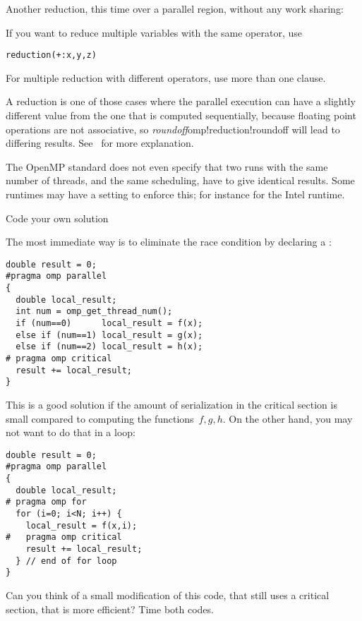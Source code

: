 Another reduction, this time over a parallel region,
without any work sharing:
%

If you want to reduce multiple variables with the same operator, use
\begin{lstlisting}
reduction(+:x,y,z)
\end{lstlisting}
For multiple reduction with different operators, use more than one clause.

\begin{remark}
  A reduction is one of those cases where the parallel execution can have a slightly different
  value from the one that is computed sequentially, because floating point operations
  are not associative, so \emph{roundoff}{omp!reduction!roundoff}
  will lead to differing results.
  See~ for more explanation.

  The OpenMP standard does not even specify that two runs with the same number of threads,
  and the same scheduling, have to give identical results.
  Some runtimes may have a setting to enforce this;
  for instance  for the Intel runtime.
\end{remark}

 {Code your own solution}

The most immediate way is to eliminate the race condition
by declaring a :
\begin{lstlisting}
double result = 0;
#pragma omp parallel
{
  double local_result;
  int num = omp_get_thread_num();
  if (num==0)      local_result = f(x);
  else if (num==1) local_result = g(x);
  else if (num==2) local_result = h(x);
# pragma omp critical
  result += local_result;
}
\end{lstlisting}

This is a good solution if the amount of serialization in the critical section
is small compared to computing the functions~$f,g,h$. On the other hand, you
may not want to do that in a loop:
\begin{lstlisting}
double result = 0;
#pragma omp parallel
{
  double local_result;
# pragma omp for
  for (i=0; i<N; i++) {
    local_result = f(x,i);
#   pragma omp critical
    result += local_result;
  } // end of for loop
}
\end{lstlisting}
\begin{exercise}
  Can you think of a small modification of this code, that still uses a critical section,
  that is more efficient? Time both codes.
\end{exercise}


